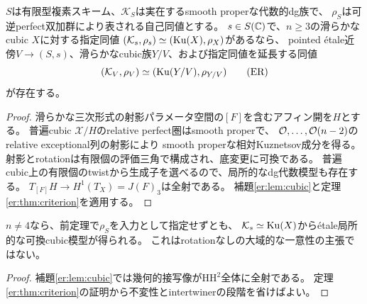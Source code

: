 \begin{theorem}[cubicのrotation付きétale局所実現]\label{er:thm:ER}
$S$は有限型複素スキーム、$\mathcal K_S$は実在するsmooth properな代数的dg族で、
$\rho_S$は可逆perfect双加群により表される自己同値とする。
$s\in S(\mathbb C)$で、$n\ge3$の滑らかなcubic $X$に対する指定同値
$(\mathcal K_s,\rho_s)\simeq(\operatorname{Ku}(X),\rho_X)$があるなら、
pointed étale近傍$V\to(S,s)$、滑らかなcubic族$Y/V$、および指定同値を延長する同値
\[
 (\mathcal K_V,\rho_V)\simeq(\operatorname{Ku}(Y/V),\rho_{Y/V})
 \tag{ER}\label{er:eq:ER}
\]
が存在する。
\end{theorem}
\begin{proof}
滑らかな三次形式の射影パラメータ空間の$[F]$を含むアフィン開を$H$とする。
普遍cubic $\mathcal X/H$のrelative perfect圏はsmooth properで、
$\mathcal O,\ldots,\mathcal O(n-2)$のrelative exceptional列の射影により
smooth properな相対Kuznetsov成分を得る。
射影とrotationは有限個の評価三角で構成され、底変更に可換である。
普遍cubic上の有限個のtwistから生成子を選べるので、局所的なdg代数模型も存在する。
$T_{[F]}H\to H^1(T_X)=J(F)_3$は全射である。
補題\ref{er:lem:cubic}と定理\ref{er:thm:criterion}を適用する。
\end{proof}

\begin{corollary}[rotationを最初に指定しない存在]\label{er:cor:unpolarized}
$n\ne4$なら、前定理で$\rho_S$を入力として指定せずとも、
$\mathcal K_s\simeq\operatorname{Ku}(X)$からétale局所的な可換cubic模型が得られる。
これはrotationなしの大域的な一意性の主張ではない。
\end{corollary}
\begin{proof}
補題\ref{er:lem:cubic}では幾何的接写像が$\mathrm{HH}^2$全体に全射である。
定理\ref{er:thm:criterion}の証明から不変性とintertwinerの段階を省けばよい。
\end{proof}
